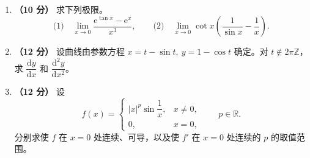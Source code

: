 \documentclass[UTF8,a4paper,zihao=-4,fontset=fandol]{ctexart}
\renewcommand{\lim}{\operatorname*{lim}\limits}
\begin{document}
\begin{enumerate}[start=17]
  \item \textbf{（10 分）} 求下列极限。
  \[
    \text{(1)}\quad\lim_{x\to0}\frac{\mathrm{e}^{\tan x}-\mathrm{e}^{x}}{x^3},
    \qquad
    \text{(2)}\quad\lim_{x\to0}\cot x\left(\frac{1}{\sin x}-\frac{1}{x}\right).
  \]
  \vspace{5.5cm}

  \item \textbf{（12 分）} 设曲线由参数方程
  $x=t-\sin t,\ y=1-\cos t$ 确定。对 $t\notin2\pi\mathbb{Z}$，
  求 $\dfrac{\mathrm{d}y}{\mathrm{d}x}$ 和 $\dfrac{\mathrm{d}^2y}{\mathrm{d}x^2}$。
  \vspace{5.5cm}

  \item \textbf{（12 分）} 设
  \[
    f(x)=
    \begin{cases}
      |x|^p\sin\dfrac{1}{x}, & x\ne0,\\
      0, & x=0,
    \end{cases}
    \qquad p\in\mathbb{R}.
  \]
  分别求使 $f$ 在 $x=0$ 处连续、可导，以及使 $f'$ 在 $x=0$ 处连续的 $p$ 的取值范围。
\end{enumerate}
\end{document}
